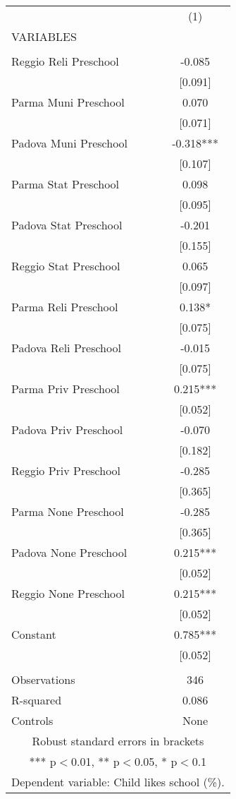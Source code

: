 \begin{tabular}{lc} \hline
 & (1) \\
VARIABLES &  \\ \hline
 &  \\
Reggio Reli Preschool & -0.085 \\
 & [0.091] \\
Parma Muni Preschool & 0.070 \\
 & [0.071] \\
Padova Muni Preschool & -0.318*** \\
 & [0.107] \\
Parma Stat Preschool & 0.098 \\
 & [0.095] \\
Padova Stat Preschool & -0.201 \\
 & [0.155] \\
Reggio Stat Preschool & 0.065 \\
 & [0.097] \\
Parma Reli Preschool & 0.138* \\
 & [0.075] \\
Padova Reli Preschool & -0.015 \\
 & [0.075] \\
Parma Priv Preschool & 0.215*** \\
 & [0.052] \\
Padova Priv Preschool & -0.070 \\
 & [0.182] \\
Reggio Priv Preschool & -0.285 \\
 & [0.365] \\
Parma None Preschool & -0.285 \\
 & [0.365] \\
Padova None Preschool & 0.215*** \\
 & [0.052] \\
Reggio None Preschool & 0.215*** \\
 & [0.052] \\
Constant & 0.785*** \\
 & [0.052] \\
 &  \\
Observations & 346 \\
R-squared & 0.086 \\
 Controls & None \\ \hline
\multicolumn{2}{c}{ Robust standard errors in brackets} \\
\multicolumn{2}{c}{ *** p$<$0.01, ** p$<$0.05, * p$<$0.1} \\
\multicolumn{2}{c}{ Dependent variable: Child likes school (\%).} \\
\end{tabular}
